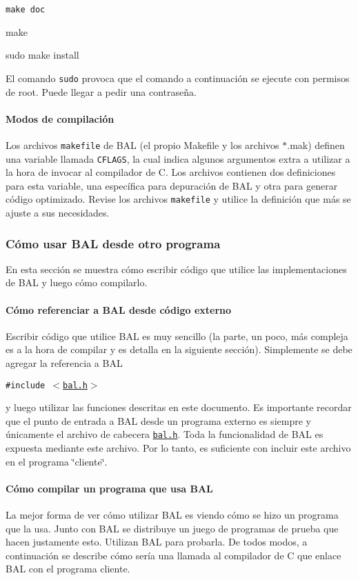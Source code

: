 {\tt  make doc\par
 make\par
 sudo make install }

El comando {\tt sudo} provoca que el comando a continuación se ejecute con permisos de root. Puede llegar a pedir una contraseña.\hypertarget{index_compilemodesec}{}\paragraph{Modos de compilación}\label{index_compilemodesec}
Los archivos {\tt makefile} de BAL (el propio Makefile y los archivos $\ast$.mak) definen una variable llamada {\tt CFLAGS}, la cual indica algunos argumentos extra a utilizar a la hora de invocar al compilador de C. Los archivos contienen dos definiciones para esta variable, una específica para depuración de BAL y otra para generar código optimizado. Revise los archivos {\tt makefile} y utilice la definición que más se ajuste a sus necesidades.\hypertarget{index_usesec}{}\subsubsection{Cómo usar BAL desde otro programa}\label{index_usesec}
En esta sección se muestra cómo escribir código que utilice las implementaciones de BAL y luego cómo compilarlo.\hypertarget{index_refusesec}{}\paragraph{Cómo referenciar a BAL desde código externo}\label{index_refusesec}
Escribir código que utilice BAL es muy sencillo (la parte, un poco, más compleja es a la hora de compilar y es detalla en la siguiente sección). Simplemente se debe agregar la referencia a BAL

{\tt  \#include $<$\hyperlink{bal_8h}{bal.h}$>$ }

y luego utilizar las funciones descritas en este documento. Es importante recordar que el punto de entrada a BAL desde un programa externo es siempre y únicamente el archivo de cabecera {\tt \hyperlink{bal_8h}{bal.h}}. Toda la funcionalidad de BAL es expuesta mediante este archivo. Por lo tanto, es suficiente con incluir este archivo en el programa \char`\"{}cliente\char`\"{}.\hypertarget{index_compileusesec}{}\paragraph{Cómo compilar un programa que usa BAL}\label{index_compileusesec}
La mejor forma de ver cómo utilizar BAL es viendo cómo se hizo un programa que la usa. Junto con BAL se distribuye un juego de programas de prueba que hacen justamente esto. Utilizan BAL para probarla. De todos modos, a continuación se describe cómo sería una llamada al compilador de C que enlace BAL con el programa cliente.

